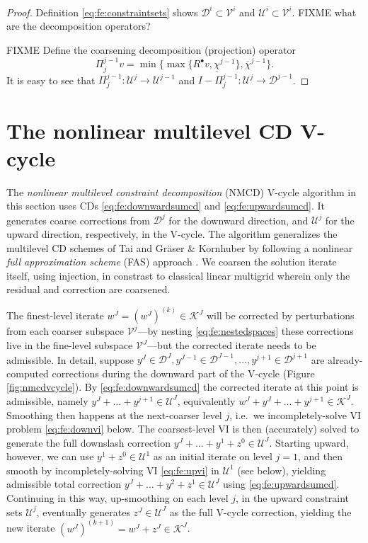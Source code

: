 \documentclass[letterpaper,final,12pt,reqno]{amsart}
\theoremstyle{cstyle}
\theoremstyle{cstyle*}
\theoremstyle{dstyle}
\numberwithin{equation}{section}
\numberwithin{figure}{section}
\numberwithin{table}{section}
\numberwithin{theorem}{section}
\newcommand{\cV}{\mathcal{V}}
\newcommand{\iR}{R^{\bullet}}
\begin{document}
\begin{proof}  Definition \eqref{eq:fe:constraintsets} shows $\mathcal{D}^i \subset \cV^i$ and $\mathcal{U}^i \subset \cV^i$.  FIXME what are the decomposition operators?

FIXME Define the coarsening decomposition (projection) operator
    $$\Pi_j^{j-1} v = \min\{\max\{\iR v, \underline{\chi}^{j-1}\}, \overline{\chi}^{j-1}\}.$$
It is easy to see that $\Pi_j^{j-1}:\mathcal{U}^j \to \mathcal{U}^{j-1}$ and $I-\Pi_j^{j-1}:\mathcal{U}^j \to \mathcal{D}^{j-1}$.
\end{proof}


\section{The nonlinear multilevel CD V-cycle} \label{sec:vcycle}

The \emph{nonlinear multilevel constraint decomposition} (NMCD) V-cycle algorithm in this section uses CDs \eqref{eq:fe:downwardsumcd} and \eqref{eq:fe:upwardsumcd}.  It generates coarse corrections from $\mathcal{D}^j$ for the downward direction, and $\mathcal{U}^j$ for the upward direction, respectively, in the V-cycle.  The algorithm generalizes the multilevel CD schemes of Tai \cite{Tai2003} and Gr\"aser \& Kornhuber \cite[Algorithm 4.7]{GraeserKornhuber2009} by following a nonlinear \emph{full approximation scheme} (FAS) approach \cite{BrandtLivne2011}.  We coarsen the solution iterate itself, using injection, in constrast to classical linear multigrid wherein only the residual and correction are coarsened.

The finest-level iterate $w^J = (w^J)^{(k)} \in \mathcal{K}^J$ will be corrected by perturbations from each coarser subspace $\mathcal{V}^j$---by nesting \eqref{eq:fe:nestedspaces} these corrections live in the fine-level subspace $\mathcal{V}^J$---but the corrected iterate needs to be admissible.  In detail, suppose $y^J \in \mathcal{D}^J, y^{J-1} \in \mathcal{D}^{J-1}, \dots, y^{j+1} \in \mathcal{D}^{j+1}$ are already-computed corrections during the downward part of the V-cycle (Figure \ref{fig:nmcdvcycle}).  By \eqref{eq:fe:downwardsumcd} the corrected iterate at this point is admissible, namely $y^J + \dots + y^{j+1} \in \mathcal{U}^J$, equivalently $w^J + y^J + \dots + y^{j+1} \in \mathcal{K}^J$.  Smoothing then happens at the next-coarser level $j$, i.e.~we incompletely-solve VI problem \eqref{eq:fe:downvi} below.  The coarsest-level VI is then (accurately) solved to generate the full downslash correction $y^J + \dots + y^1 + z^0 \in \mathcal{U}^J$.  Starting upward, however, we can use $y^1+ z^0 \in \mathcal{U}^1$ as an initial iterate on level $j=1$, and then smooth by incompletely-solving VI \eqref{eq:fe:upvi} in $\mathcal{U}^1$ (see below), yielding admissible total correction $y^J + \dots + y^2 + z^1 \in \mathcal{U}^J$ using \eqref{eq:fe:upwardsumcd}.  Continuing in this way, up-smoothing on each level $j$, in the upward constraint sets $\mathcal{U}^j$, eventually generates $z^J\in \mathcal{U}^J$ as the full V-cycle correction, yielding the new iterate $(w^J)^{(k+1)}  = w^J + z^J \in \mathcal{K}^J$.
\end{document}
